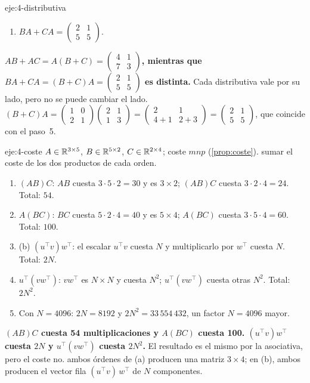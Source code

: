 \begin{solucion}{eje:4-distributiva}
\begin{enumerate}[label=\arabic*.]
  \item $BA+CA=\begin{pmatrix}2&1\\5&5\end{pmatrix}$.
\end{enumerate}
\resultado \textbf{$AB+AC=A(B+C)=\begin{pmatrix}4&1\\7&3\end{pmatrix}$, mientras que $BA+CA=(B+C)A=\begin{pmatrix}2&1\\5&5\end{pmatrix}$ es distinta.} Cada distributiva vale por su lado, pero no se puede cambiar el lado.
\comprobacion $(B+C)A=\begin{pmatrix}1&0\\2&1\end{pmatrix}\begin{pmatrix}2&1\\1&3\end{pmatrix}=\begin{pmatrix}2&1\\4+1&2+3\end{pmatrix}=\begin{pmatrix}2&1\\5&5\end{pmatrix}$, que coincide con el paso~5.
\end{solucion}

\begin{solucion}{eje:4-coste}
\datos $A\in\mathbb{R}^{3\times 5}$, $B\in\mathbb{R}^{5\times 2}$, $C\in\mathbb{R}^{2\times 4}$; coste $mnp$ (\cref{prop:coste}).
\planteamiento sumar el coste de los dos productos de cada orden.
\pasos
\begin{enumerate}[label=\arabic*.]
  \item $(AB)C$: $AB$ cuesta $3\cdot 5\cdot 2=30$ y es $3\times 2$; $(AB)C$ cuesta $3\cdot 2\cdot 4=24$. Total: $54$.
  \item $A(BC)$: $BC$ cuesta $5\cdot 2\cdot 4=40$ y es $5\times 4$; $A(BC)$ cuesta $3\cdot 5\cdot 4=60$. Total: $100$.
  \item (b) $(u^{\top}v)w^{\top}$: el escalar $u^{\top}v$ cuesta $N$ y multiplicarlo por $w^{\top}$ cuesta $N$. Total: $2N$.
  \item $u^{\top}(vw^{\top})$: $vw^{\top}$ es $N\times N$ y cuesta $N^{2}$; $u^{\top}(vw^{\top})$ cuesta otras $N^{2}$. Total: $2N^{2}$.
  \item Con $N=4096$: $2N=8192$ y $2N^{2}=33\,554\,432$, un factor $N=4096$ mayor.
\end{enumerate}
\resultado \textbf{$(AB)C$ cuesta 54 multiplicaciones y $A(BC)$ cuesta 100. $(u^{\top}v)w^{\top}$ cuesta $2N$ y $u^{\top}(vw^{\top})$ cuesta $2N^{2}$.} El resultado es el mismo por la asociativa, pero el coste no.
\comprobacion ambos órdenes de (a) producen una matriz $3\times 4$; en (b), ambos producen el vector fila $(u^{\top}v)\,w^{\top}$ de $N$ componentes.
\end{solucion}

